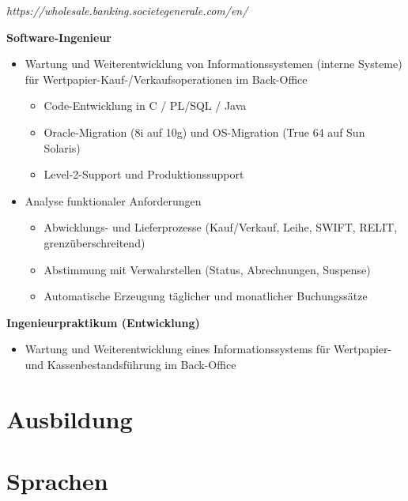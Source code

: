 \documentclass[11pt,a4paper]{moderncv}
\begin{document}
\newpage

{
	\textit{https://wholesale.banking.societegenerale.com/en/}

	\bigskip
	\textbf{Software-Ingenieur}
\bigskip
\begin{itemize}
\item Wartung und Weiterentwicklung von Informationssystemen (interne Systeme) für Wertpapier-Kauf-/Verkaufsoperationen im Back-Office
	\begin{itemize}
		\item Code-Entwicklung in C / PL/SQL / Java
		\item Oracle-Migration (8i auf 10g) und OS-Migration (True 64 auf Sun Solaris)
		\item Level-2-Support und Produktionssupport
\end{itemize}
\bigskip
\item Analyse funktionaler Anforderungen
	\begin{itemize}
		\item Abwicklungs- und Lieferprozesse (Kauf/Verkauf, Leihe, SWIFT, RELIT, grenzüberschreitend)
		\item Abstimmung mit Verwahrstellen (Status, Abrechnungen, Suspense)
		\item Automatische Erzeugung täglicher und monatlicher Buchungssätze
	\end{itemize}
\end{itemize}
}
\bigskip
{}
{
\bigskip
\textbf{Ingenieurpraktikum (Entwicklung)}
\bigskip
\begin{itemize}
	\item Wartung und Weiterentwicklung eines Informationssystems für Wertpapier- und Kassenbestandsführung im Back-Office
\end{itemize}
}
\section{Ausbildung}



\section{Sprachen}
\end{document}
